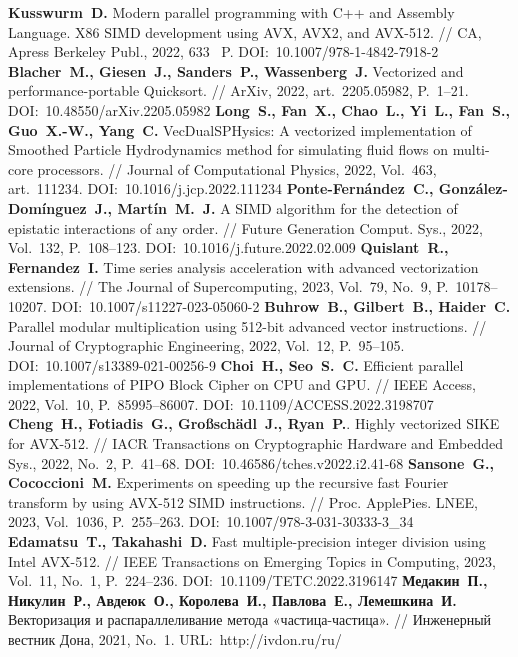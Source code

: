 \begin{thebibliography}{99}
%
%
\textbf{Kusswurm~D.} Modern parallel programming with C++ and Assembly Language. X86 SIMD development using AVX, AVX2, and AVX-512. // CA, Apress Berkeley Publ., 2022, 633~ P. DOI:~10.1007/978-1-4842-7918-2
%
\textbf{Blacher~M., Giesen~J., Sanders~P., Wassenberg~J.} Vectorized and performance-portable Quicksort. // ArXiv, 2022, art.~2205.05982, P.~1–21. DOI:~10.48550/arXiv.2205.05982
%
\textbf{Long~S., Fan~X., Chao~L., Yi~L., Fan~S., Guo~X.-W., Yang~C.} VecDualSPHysics: A vectorized implementation of Smoothed Particle Hydrodynamics method for simulating fluid flows on multi-core processors. // Journal of Computational Physics, 2022, Vol.~463, art.~111234. DOI:~10.1016/j.jcp.2022.111234
%
\textbf{Ponte-Fern{\'a}ndez~C., Gonz{\'a}lez-Dom{\'i}nguez~J., Mart{\'i}n~M.~J.} A SIMD algorithm for the detection of epistatic interactions of any order. // Future Generation Comput. Sys., 2022, Vol.~132, P.~108–123. DOI:~10.1016/j.future.2022.02.009
%
\textbf{Quislant~R., Fernandez~I.} Time series analysis acceleration with advanced vectorization extensions. // The Journal of Supercomputing, 2023, Vol.~79, No.~9, P.~10178–10207. DOI:~10.1007/s11227-023-05060-2
%
\textbf{Buhrow~B., Gilbert~B., Haider~C.} Parallel modular multiplication using 512-bit advanced vector instructions. // Journal of Cryptographic Engineering, 2022, Vol.~12, P.~95–105. DOI:~10.1007/s13389-021-00256-9
%
\textbf{Choi~H., Seo~S.~C.} Efficient parallel implementations of PIPO Block Cipher on CPU and GPU. // IEEE Access, 2022, Vol.~10, P.~85995–86007. DOI:~10.1109/ACCESS.2022.3198707
%
\textbf{Cheng~H., Fotiadis~G., Gro{\ss}sch{\"a}dl~J., Ryan~P.}. Highly vectorized SIKE for AVX-512. // IACR Transactions on Cryptographic Hardware and Embedded Sys., 2022, No.~2, P.~41–68. DOI:~10.46586/tches.v2022.i2.41-68
%
\textbf{Sansone~G., Cococcioni~M.} Experiments on speeding up the recursive fast Fourier transform by using AVX-512 SIMD instructions. // Proc. ApplePies. LNEE, 2023, Vol.~1036, P.~255–263. DOI:~10.1007/978-3-031-30333-3\_34
%
\textbf{Edamatsu~T., Takahashi~D.} Fast multiple-precision integer division using Intel AVX-512. // IEEE Transactions on Emerging Topics in Computing, 2023, Vol.~11, No.~1, P.~224–236. DOI:~10.1109/TETC.2022.3196147
%
\textbf{Медакин~П., Никулин~Р., Авдеюк~О., Королева~И., Павлова~Е., Лемешкина~И.} Векторизация и распараллеливание метода «частица-частица». // Инженерный вестник Дона, 2021, No.~1. URL:~http://ivdon.ru/ru/

\end{thebibliography}
